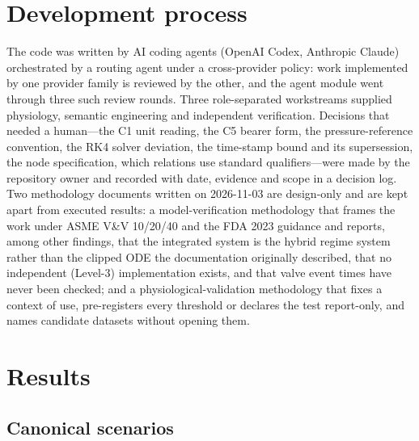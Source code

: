 \documentclass[11pt,letterpaper]{article}
\begin{document}
\section{Development process}
\label{sec:process}

The code was written by AI coding agents (OpenAI Codex, Anthropic Claude) orchestrated by a routing agent under a cross-provider policy: work implemented by one provider family is reviewed by the other, and the agent module went through three such review rounds. Three role-separated workstreams supplied physiology, semantic engineering and independent verification. Decisions that needed a human---the C1 unit reading, the C5 bearer form, the pressure-reference convention, the RK4 solver deviation, the time-stamp bound and its supersession, the node specification, which relations use standard qualifiers---were made by the repository owner and recorded with date, evidence and scope in a decision log. Two methodology documents written on 2026-11-03 are design-only and are kept apart from executed results: a model-verification methodology that frames the work under ASME V\&V 10/20/40 and the FDA 2023 guidance and reports, among other findings, that the integrated system is the hybrid regime system rather than the clipped ODE the documentation originally described, that no independent (Level-3) implementation exists, and that valve event times have never been checked; and a physiological-validation methodology that fixes a context of use, pre-registers every threshold or declares the test report-only, and names candidate datasets without opening them.

\section{Results}
\label{sec:results}

\subsection{Canonical scenarios}
\end{document}
